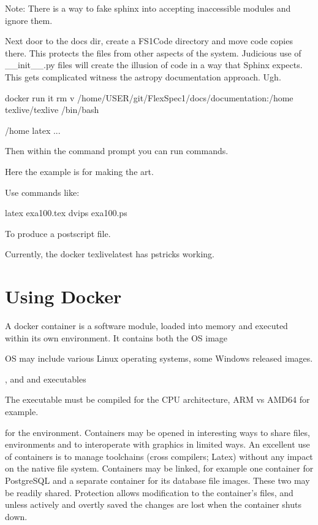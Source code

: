 \documentclass[letterpaper,10pt,english,openany,oneside]{sphinxmanual}
\begin{document}
\sphinxAtStartPar
Note: There is a way to fake sphinx into accepting inaccessible
modules and ignore them.

\sphinxAtStartPar
Next door to the docs dir, create a FS1Code directory and move
code copies there. This protects the files from other aspects
of the system. Judicious use of \_\_init\_\_.py files will create
the illusion of code in a way that Sphinx expects. This gets
complicated \textendash{} witness the astropy documentation approach.
Ugh.

\begin{sphinxVerbatim}[commandchars=\\\{\}]
docker run \PYGZhy{}it \PYGZhy{}\PYGZhy{}rm \PYGZhy{}v /home/USER/git/FlexSpec1/docs/documentation:/home 
   texlive/texlive /bin/bash

 /home
latex ... 
\end{sphinxVerbatim}

\sphinxAtStartPar
Then within the command prompt you can run commands.

\sphinxAtStartPar
Here the example is for making the art.

\sphinxAtStartPar
Use commands like:

\begin{sphinxVerbatim}[commandchars=\\\{\}]
\PYGZgt{} latex exa100.tex
\PYGZgt{} dvips exa100.ps
\end{sphinxVerbatim}

\sphinxAtStartPar
To produce a postscript file.

\sphinxAtStartPar
Currently, the docker texlive\sphinxhyphen{}latest has pstricks working.


\chapter{Using Docker}
\label{\detokenize{docker:using-docker}}\label{\detokenize{docker::doc}}
\sphinxAtStartPar
A docker container is a software module, loaded into memory and
executed within its own environment. It contains both the OS image %
\begin{footnote}[1]\sphinxAtStartFootnote
OS may include various Linux operating systems, some Windows released images.
%
\end{footnote},
and and executables %
\begin{footnote}[2]\sphinxAtStartFootnote
The executable must be compiled for the CPU architecture, ARM vs AMD64 for example.
%
\end{footnote} for the environment. Containers may be opened
in interesting ways to share files, environments and to interoperate
with graphics in limited ways. An excellent use of containers is
to manage toolchains (cross compilers; Latex) without any impact
on the native file system. Containers may be linked, for example
one container for PostgreSQL and a separate container for its
database file images. These two may be readily shared. Protection
allows modification to the container’s files, and unless actively
and overtly saved the changes are lost when the container shuts
down.
\end{document}
